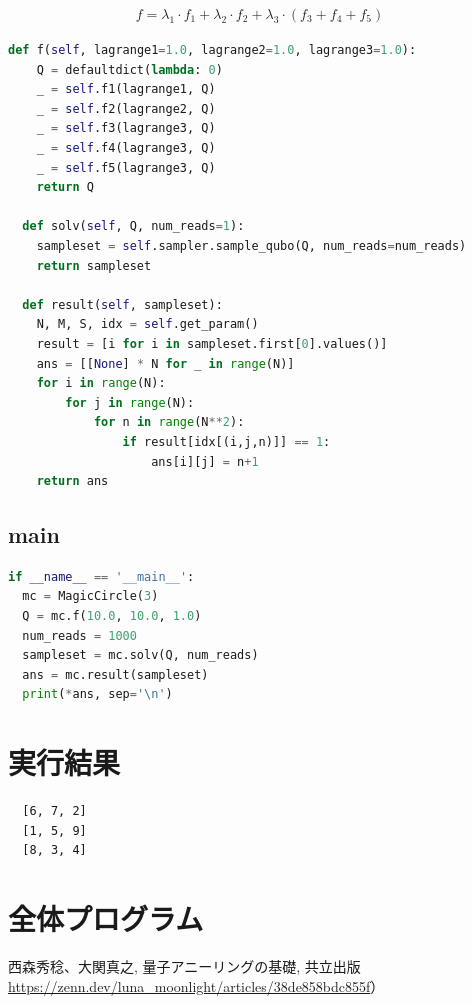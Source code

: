 \documentclass[uplatex,dvipdfmx,a4paper,11pt,oneside,openany]{jsbook}
\begin{document}
\begin{eqnarray*}
  f = \lambda_1\cdot f_1 + \lambda_2\cdot f_2 + \lambda_3\cdot(f_3 + f_4 + f_5)
\end{eqnarray*}

\begin{lstlisting}[language=Python]
  def f(self, lagrange1=1.0, lagrange2=1.0, lagrange3=1.0):
    Q = defaultdict(lambda: 0)
    _ = self.f1(lagrange1, Q)
    _ = self.f2(lagrange2, Q)
    _ = self.f3(lagrange3, Q)
    _ = self.f4(lagrange3, Q)
    _ = self.f5(lagrange3, Q)
    return Q

  def solv(self, Q, num_reads=1):
    sampleset = self.sampler.sample_qubo(Q, num_reads=num_reads)
    return sampleset

  def result(self, sampleset):
    N, M, S, idx = self.get_param()
    result = [i for i in sampleset.first[0].values()]
    ans = [[None] * N for _ in range(N)]
    for i in range(N):
        for j in range(N):
            for n in range(N**2):
                if result[idx[(i,j,n)]] == 1:
                    ans[i][j] = n+1
    return ans
\end{lstlisting}

\subsection{main}

\begin{lstlisting}[language=Python]
if __name__ == '__main__':
  mc = MagicCircle(3)
  Q = mc.f(10.0, 10.0, 1.0)
  num_reads = 1000
  sampleset = mc.solv(Q, num_reads)
  ans = mc.result(sampleset)
  print(*ans, sep='\n')
\end{lstlisting}

\newpage

\section{実行結果}

\begin{verbatim}
  [6, 7, 2]
  [1, 5, 9]
  [8, 3, 4]
\end{verbatim}

\section{全体プログラム}



\begin{thebibliography}{9}
   西森秀稔、大関真之, 量子アニーリングの基礎, 共立出版
   \url{https://zenn.dev/luna_moonlight/articles/38de858bdc855f}）
\end{thebibliography}
\end{document}
